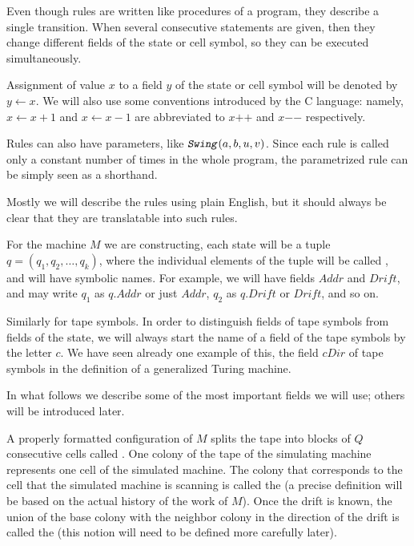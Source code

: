 \documentclass[12pt]{memoir}
\newcommand{\fld}[1]{\ensuremath{\textit{#1}}}
\newcommand{\rul}[1]{\ensuremath{\texttt{\slshape #1\/}}}
\newcommand{\Addr}{\fld{Addr}}
\newcommand{\cDir}{\fld{cDir}}
\newcommand{\Drift}{\fld{Drift}}
\newcommand{\increment}[1]{#1\mathord{+}\mathord{+}}
\newcommand{\decrement}[1]{#1\mathord{-}\mathord{-}}
\newcommand{\ruSwing}{\rul{Swing}}
\begin{document}
Even though rules are written like procedures of a program,
they describe a single transition.
When several consecutive statements are given, then they
change different fields of the state or
cell symbol, so they can be executed simultaneously.

Assignment of value \( x \) to a field \( y \) of the state or cell symbol will
be denoted by \( y \gets x \).
We will also use some conventions introduced by the C language:
namely,
\( x\gets x+1 \) and \( x\gets x-1 \) are abbreviated to \( \increment{x} \) and
\( \decrement{x} \) respectively.

Rules can also have parameters, like \( \ruSwing(a,b,u,v) \).
Since each rule is called only a constant number of times in the whole program,
the parametrized rule can be simply seen as a shorthand.

Mostly we will describe
the rules using plain English, but it should always be clear that they
are translatable into such rules.



\begin{sloppypar}
For the machine \( M \) we are constructing, each state will 
be a tuple \( q=(q_{1},q_{2},\dots,q_{k}) \),
where the individual elements of the tuple will be called , and will
have symbolic names.
For example, we will have fields \( \Addr \) and \( \Drift \),
and may write \( q_{1} \) as \( q.\Addr \) or just \( \Addr \), 
\( q_{2} \) as \( q.\Drift \) or \( \Drift \), and so on.
\end{sloppypar}

Similarly for tape symbols.
In order to distinguish fields of tape symbols from fields of the state,
we will always start the name of a field of the tape symbols by the letter \( c \).
We have seen already one example of this, the field \( \cDir \) of tape symbols
in the definition of a generalized Turing machine.

In what follows we describe some of the most important fields we will use;
others will be introduced later.

A properly formatted configuration of \( M \) splits the tape into blocks of \( Q \)
consecutive cells called .
One colony of the tape of the simulating
machine represents one cell of the simulated machine.
The colony that corresponds to the cell that the
simulated machine is scanning is called the 
(a precise definition will be based on the actual history of the work of \( M \)).
Once the drift is known, the union of the base colony with the neighbor colony in
the direction of the drift is called the  (this notion will 
need to be defined more carefully later).
\end{document}
